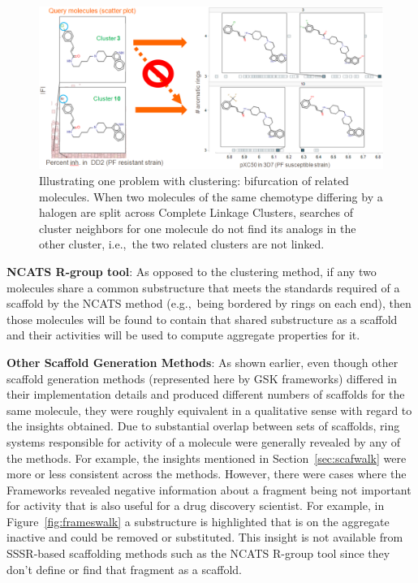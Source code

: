 \documentclass[journal=jacsat,manuscript=article]{achemso}
\newcommand*\fref[1]{Figure~\ref{fig:#1}}
\newcommand*\sref[1]{Section~\ref{sec:#1}}
\newcommand*\eg{e.g.,~}
\newcommand*\ie{i.e.,~}
\begin{document}
\begin{figure}
\includegraphics[width=6in]{fig/clusterlanes.png}
\caption{Illustrating one problem with clustering: bifurcation of related molecules.  When two molecules of the same chemotype differing by a halogen are split across Complete Linkage Clusters, searches of cluster neighbors for one molecule do not find its analogs in the other cluster, \ie the two related clusters are not linked.}
\label{fig:clusterlanes}
\end{figure}



{\bf NCATS R-group tool}: As opposed to the clustering method, 
if any two molecules share a common substructure that meets the standards required of a scaffold by the NCATS method (\eg being bordered by rings on each end), then those molecules will be found to contain that shared substructure as a scaffold and their activities will be used to compute aggregate properties for it. 

{\bf Other Scaffold Generation Methods}: As shown earlier, even though other scaffold generation methods (represented here by GSK frameworks) differed in their implementation details and produced different numbers of scaffolds for the same molecule, they were roughly equivalent in a qualitative sense with regard to the insights obtained. Due to substantial overlap between sets of scaffolds, ring systems responsible for activity of a molecule were generally revealed by any of the methods. For example, the insights mentioned in \sref{scafwalk} were more or less consistent across the methods. However, there were cases where the Frameworks revealed negative information about a fragment being not important for activity that is also useful for a drug discovery scientist. For example, in \fref{frameswalk} a substructure is highlighted that is on the aggregate inactive and could be removed or substituted. This insight is not available from SSSR-based scaffolding methods such as the NCATS R-group tool since they don't define or find that fragment as a scaffold.
\end{document}
